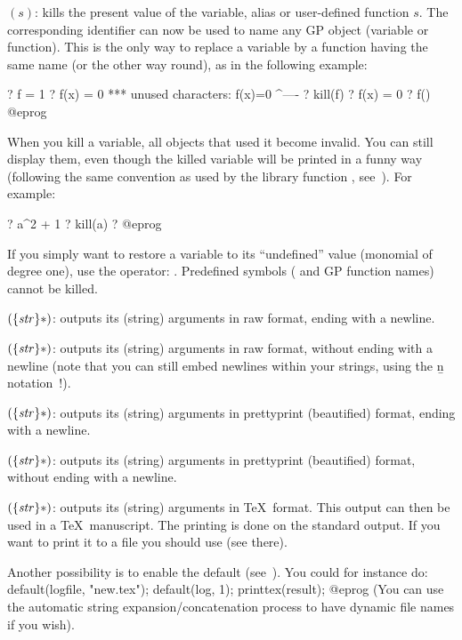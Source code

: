 $(s)$:\label{se:kill} kills the present value of the
variable, alias or user-defined function $s$. The corresponding identifier
can now be used to name any GP object (variable or function). This is the
only way to replace a variable by a function having the same name (or the
other way round), as in the following example:

\bprog
? f = 1
? f(x) = 0
  ***   unused characters: f(x)=0
                            ^----
? kill(f)
? f(x) = 0
? f()
@eprog

  When you kill a variable, all objects that used it become invalid. You
can still display them, even though the killed variable will be printed in a
funny way (following the same convention as used by the library function
, see~). For example:

\bprog
? a^2 + 1
? kill(a)
? %
@eprog

If you simply want to restore a variable to its ``undefined'' value
(monomial of degree one), use the  operator: .
Predefined symbols ( and GP function names) cannot be killed.

$(\{\hbox{\it str\/}\}*)$: outputs its (string) arguments in raw
format, ending with a newline.

$(\{\hbox{\it str\/}\}*)$: outputs its (string) arguments in raw
format, without ending with a newline (note that you can still embed newlines
within your strings, using the \b{n} notation~!).

$(\{\hbox{\it str\/}\}*)$: outputs its (string) arguments in
prettyprint (beautified) format, ending with a newline.

$(\{\hbox{\it str\/}\}*)$: outputs its (string) arguments in
prettyprint (beautified) format, without ending with a newline.

$(\{\hbox{\it str\/}\}*)$: outputs its (string) arguments in
\TeX\ format. This output can then be used in a \TeX\ manuscript.
The printing is done on the standard output. If you want to print it to a
file you should use  (see there).

Another possibility is to enable the  default
(see~).
You could for instance do:
%
\bprog
default(logfile, "new.tex");
default(log, 1);
printtex(result);
@eprog
\noindent
(You can use the automatic string expansion/concatenation process to have
dynamic file names if you wish).

